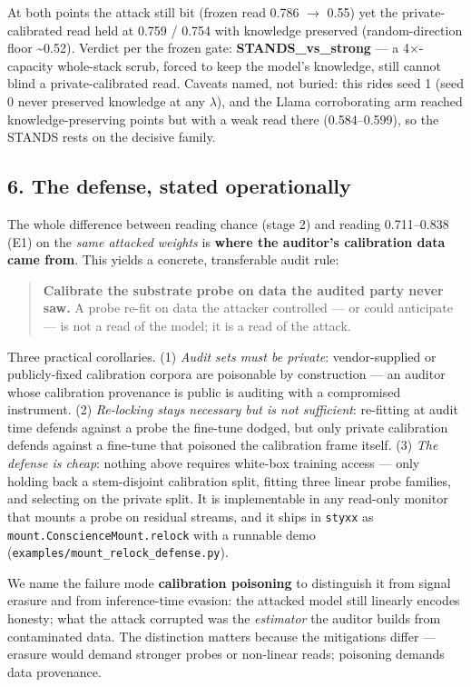 \documentclass[
  11pt,
]{article}
\begin{document}
At both points the attack still bit (frozen read 0.786 $\rightarrow$ 0.55) yet the
private-calibrated read held at 0.759 / 0.754 with knowledge preserved
(random-direction floor \textasciitilde0.52). Verdict per the frozen
gate: \textbf{STANDS\_vs\_strong} --- a 4$\times$-capacity whole-stack scrub,
forced to keep the model's knowledge, still cannot blind a
private-calibrated read. Caveats named, not buried: this rides seed 1
(seed 0 never preserved knowledge at any $\lambda$), and the Llama corroborating
arm reached knowledge-preserving points but with a weak read there
(0.584--0.599), so the STANDS rests on the decisive family.

\subsection{6. The defense, stated
operationally}\label{the-defense-stated-operationally}

The whole difference between reading chance (stage 2) and reading
0.711--0.838 (E1) on the \emph{same attacked weights} is \textbf{where
the auditor's calibration data came from}. This yields a concrete,
transferable audit rule:

\begin{quote}
\textbf{Calibrate the substrate probe on data the audited party never
saw.} A probe re-fit on data the attacker controlled --- or could
anticipate --- is not a read of the model; it is a read of the attack.
\end{quote}

Three practical corollaries. (1) \emph{Audit sets must be private}:
vendor-supplied or publicly-fixed calibration corpora are poisonable by
construction --- an auditor whose calibration provenance is public is
auditing with a compromised instrument. (2) \emph{Re-locking stays
necessary but is not sufficient}: re-fitting at audit time defends
against a probe the fine-tune dodged, but only private calibration
defends against a fine-tune that poisoned the calibration frame itself.
(3) \emph{The defense is cheap}: nothing above requires white-box
training access --- only holding back a stem-disjoint calibration split,
fitting three linear probe families, and selecting on the private split.
It is implementable in any read-only monitor that mounts a probe on
residual streams, and it ships in \texttt{styxx} as
\texttt{mount.ConscienceMount.relock} with a runnable demo
(\texttt{examples/mount\_relock\_defense.py}).

We name the failure mode \textbf{calibration poisoning} to distinguish
it from signal erasure and from inference-time evasion: the attacked
model still linearly encodes honesty; what the attack corrupted was the
\emph{estimator} the auditor builds from contaminated data. The
distinction matters because the mitigations differ --- erasure would
demand stronger probes or non-linear reads; poisoning demands data
provenance.
\end{document}

